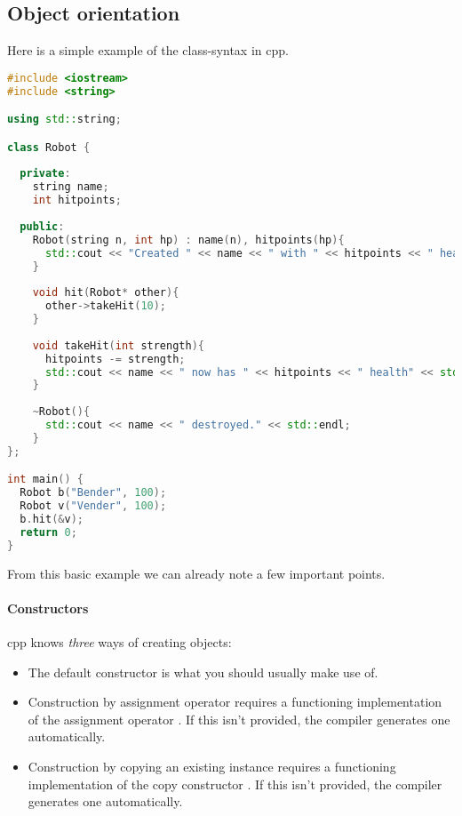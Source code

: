 \subsection{Object orientation}
Here is a simple example of the class-syntax in cpp.

\begin{lstlisting}[language=c++]
#include <iostream>
#include <string>

using std::string;

class Robot {
  
  private:
    string name;
    int hitpoints;
  
  public:
    Robot(string n, int hp) : name(n), hitpoints(hp){
      std::cout << "Created " << name << " with " << hitpoints << " health" << std::endl;
    }
    
    void hit(Robot* other){
      other->takeHit(10);
    }
    
    void takeHit(int strength){
      hitpoints -= strength;
      std::cout << name << " now has " << hitpoints << " health" << std::endl;
    }
    
    ~Robot(){
      std::cout << name << " destroyed." << std::endl;
    }
};

int main() {
  Robot b("Bender", 100);
  Robot v("Vender", 100);
  b.hit(&v);
  return 0;
}
\end{lstlisting}

From this basic example we can already note a few important points.


\paragraph{Constructors} cpp knows \emph{three} ways of creating objects: 
\begin{itemize}
    \item The default constructor  is what you should usually make use of. 
    \item Construction by assignment operator  requires a functioning implementation of the assignment operator . If this isn't provided, the compiler generates one automatically. 
    \item Construction by copying an existing instance  requires a functioning implementation of the copy constructor . If this isn't provided, the compiler generates one automatically. 
\end{itemize}

